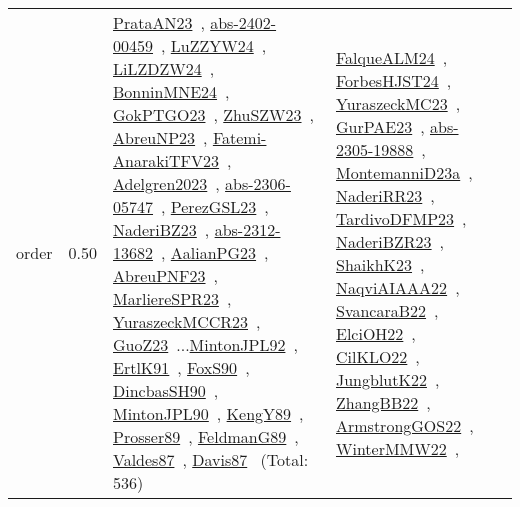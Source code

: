 {\begin{longtable}{p{3cm}r>{\raggedright\arraybackslash}p{6cm}>{\raggedright\arraybackslash}p{6cm}>{\raggedright\arraybackslash}p{8cm}}
\index{order}\index{Scheduling!order}order &  0.50 & \href{../works/PrataAN23.pdf}{PrataAN23}~\cite{PrataAN23}, \href{../works/abs-2402-00459.pdf}{abs-2402-00459}~\cite{abs-2402-00459}, \href{../works/LuZZYW24.pdf}{LuZZYW24}~\cite{LuZZYW24}, \href{../works/LiLZDZW24.pdf}{LiLZDZW24}~\cite{LiLZDZW24}, \href{../works/BonninMNE24.pdf}{BonninMNE24}~\cite{BonninMNE24}, \href{../works/GokPTGO23.pdf}{GokPTGO23}~\cite{GokPTGO23}, \href{../works/ZhuSZW23.pdf}{ZhuSZW23}~\cite{ZhuSZW23}, \href{../works/AbreuNP23.pdf}{AbreuNP23}~\cite{AbreuNP23}, \href{../works/Fatemi-AnarakiTFV23.pdf}{Fatemi-AnarakiTFV23}~\cite{Fatemi-AnarakiTFV23}, \href{../works/Adelgren2023.pdf}{Adelgren2023}~\cite{Adelgren2023}, \href{../works/abs-2306-05747.pdf}{abs-2306-05747}~\cite{abs-2306-05747}, \href{../works/PerezGSL23.pdf}{PerezGSL23}~\cite{PerezGSL23}, \href{../works/NaderiBZ23.pdf}{NaderiBZ23}~\cite{NaderiBZ23}, \href{../works/abs-2312-13682.pdf}{abs-2312-13682}~\cite{abs-2312-13682}, \href{../works/AalianPG23.pdf}{AalianPG23}~\cite{AalianPG23}, \href{../works/AbreuPNF23.pdf}{AbreuPNF23}~\cite{AbreuPNF23}, \href{../works/MarliereSPR23.pdf}{MarliereSPR23}~\cite{MarliereSPR23}, \href{../works/YuraszeckMCCR23.pdf}{YuraszeckMCCR23}~\cite{YuraszeckMCCR23}, \href{../works/GuoZ23.pdf}{GuoZ23}~\cite{GuoZ23}...\href{../works/MintonJPL92.pdf}{MintonJPL92}~\cite{MintonJPL92}, \href{../works/ErtlK91.pdf}{ErtlK91}~\cite{ErtlK91}, \href{../works/FoxS90.pdf}{FoxS90}~\cite{FoxS90}, \href{../works/DincbasSH90.pdf}{DincbasSH90}~\cite{DincbasSH90}, \href{../works/MintonJPL90.pdf}{MintonJPL90}~\cite{MintonJPL90}, \href{../works/KengY89.pdf}{KengY89}~\cite{KengY89}, \href{../works/Prosser89.pdf}{Prosser89}~\cite{Prosser89}, \href{../works/FeldmanG89.pdf}{FeldmanG89}~\cite{FeldmanG89}, \href{../works/Valdes87.pdf}{Valdes87}~\cite{Valdes87}, \href{../works/Davis87.pdf}{Davis87}~\cite{Davis87} (Total: 536) & \href{../works/FalqueALM24.pdf}{FalqueALM24}~\cite{FalqueALM24}, \href{../works/ForbesHJST24.pdf}{ForbesHJST24}~\cite{ForbesHJST24}, \href{../works/YuraszeckMC23.pdf}{YuraszeckMC23}~\cite{YuraszeckMC23}, \href{../works/GurPAE23.pdf}{GurPAE23}~\cite{GurPAE23}, \href{../works/abs-2305-19888.pdf}{abs-2305-19888}~\cite{abs-2305-19888}, \href{../works/MontemanniD23a.pdf}{MontemanniD23a}~\cite{MontemanniD23a}, \href{../works/NaderiRR23.pdf}{NaderiRR23}~\cite{NaderiRR23}, \href{../works/TardivoDFMP23.pdf}{TardivoDFMP23}~\cite{TardivoDFMP23}, \href{../works/NaderiBZR23.pdf}{NaderiBZR23}~\cite{NaderiBZR23}, \href{../works/ShaikhK23.pdf}{ShaikhK23}~\cite{ShaikhK23}, \href{../works/NaqviAIAAA22.pdf}{NaqviAIAAA22}~\cite{NaqviAIAAA22}, \href{../works/SvancaraB22.pdf}{SvancaraB22}~\cite{SvancaraB22}, \href{../works/ElciOH22.pdf}{ElciOH22}~\cite{ElciOH22}, \href{../works/CilKLO22.pdf}{CilKLO22}~\cite{CilKLO22}, \href{../works/JungblutK22.pdf}{JungblutK22}~\cite{JungblutK22}, \href{../works/ZhangBB22.pdf}{ZhangBB22}~\cite{ZhangBB22}, \href{../works/ArmstrongGOS22.pdf}{ArmstrongGOS22}~\cite{ArmstrongGOS22}, \href{../works/WinterMMW22.pdf}{WinterMMW22}~\cite{WinterMMW22}, 
\end{longtable}}
